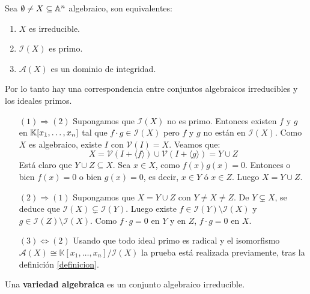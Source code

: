 \documentclass[ACGA.tex]{subfiles}
\begin{document}
\begin{prop}
Sea $\emptyset \neq X \subseteq \mathbb{A}^n$ algebraico, son equivalentes:
\begin{enumerate}
	\item $X$ es irreducible.
	\item $\mathcal{I}(X)$ es primo.
	\item $\mathcal{A}(X)$ es un dominio de integridad.
\end{enumerate}
	Por lo tanto hay una correspondencia entre conjuntos algebraicos irreducibles y los ideales primos.
\end{prop}
\begin{dem}\mbox{}
\begin{itemize}
	\item[$(1) \Rightarrow (2)$] Supongamos que $\mathcal{I}(X)$ no es primo. Entonces existen $f$ y $g$ en $\mathbb{K}[x_1,\dots,x_n]$ tal que $f\cdot g \in \mathcal{I}(X)$ pero $f$ y $g$ no están en $\mathcal{I}(X)$. Como $X$ es algebraico, existe $I$ con $\mathcal{V}(I)=X$. Veamos que:
	\[ X = \mathcal{V}(I + \langle f\rangle) \cup \mathcal{V}(I+\langle g\rangle) = Y \cup Z \]
	Está claro que $Y \cup Z \subseteq X$. Sea $x \in X$, como $f(x)g(x) = 0$. Entonces o bien $f(x)=0$ o bien $g(x)=0$, es decir, $x \in Y$ ó $x \in Z$. Luego $X = Y \cup Z$.
	
	\item[$(2) \Rightarrow (1)$] Supongamos que $X = Y \cup Z$ con $Y \neq X \neq Z$. De $Y \subsetneq X$, se deduce que $\mathcal{I}(X) \subsetneq \mathcal{I}(Y)$. Luego existe $f \in \mathcal{I}(Y) \setminus \mathcal{I}(X)$ y $g \in \mathcal{I}(Z) \setminus \mathcal{I}(X)$. Como $f \cdot g = 0$ en $Y$ y en $Z$, $f \cdot g = 0$ en $X$.
	
	\item[$(3) \Leftrightarrow (2)$] Usando que todo ideal primo es radical y el isomorfismo $\mathcal{A}(X)\cong\mathbb{K}[x_1,\dots,x_n]/\mathcal{I}(X)$ la prueba está realizada previamente, tras la definición \ref{definicion}.
\end{itemize}
\end{dem}

\begin{defi}
Una \textbf{variedad algebraica} es un conjunto algebraico irreducible.
\end{defi}
\end{document}
